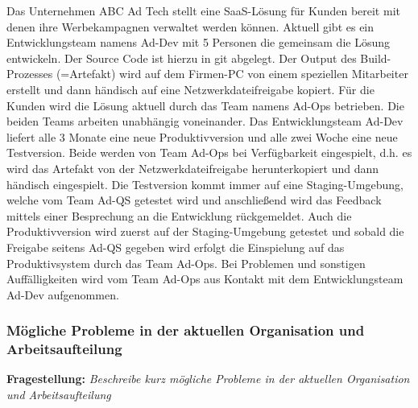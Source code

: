 Das Unternehmen ABC Ad Tech stellt eine SaaS-Lösung für Kunden bereit mit denen ihre
Werbekampagnen verwaltet werden können.
Aktuell gibt es ein Entwicklungsteam namens  Ad-Dev  mit 5 Personen die gemeinsam die
Lösung entwickeln. Der Source Code ist hierzu in git abgelegt. Der Output des Build-Prozesses
(=Artefakt) wird auf dem Firmen-PC von einem speziellen Mitarbeiter erstellt und dann
händisch auf eine Netzwerkdateifreigabe kopiert.
Für die Kunden wird die Lösung aktuell durch das Team namens Ad-Ops betrieben.
Die beiden Teams arbeiten unabhängig voneinander.
Das Entwicklungsteam Ad-Dev liefert alle 3 Monate eine neue Produktivversion und alle
zwei Woche eine neue Testversion. Beide werden von Team Ad-Ops bei Verfügbarkeit
eingespielt, d.h. es wird das Artefakt von der Netzwerkdateifreigabe herunterkopiert und dann
händisch eingespielt. Die Testversion kommt immer auf eine Staging-Umgebung, welche
vom Team Ad-QS getestet wird und anschließend wird das Feedback mittels einer
Besprechung an die Entwicklung rückgemeldet. Auch die Produktivversion wird zuerst auf der
Staging-Umgebung getestet und sobald die Freigabe seitens  Ad-QS  gegeben wird erfolgt die
Einspielung auf das Produktivsystem durch das Team Ad-Ops. Bei Problemen und sonstigen
Auffälligkeiten wird vom Team  Ad-Ops  aus Kontakt mit dem Entwicklungsteam  Ad-Dev 
aufgenommen.\\


\subsubsection{Mögliche Probleme in der aktuellen Organisation und Arbeitsaufteilung}

\textbf{Fragestellung:} \textit{Beschreibe kurz mögliche Probleme in der aktuellen Organisation und Arbeitsaufteilung}

